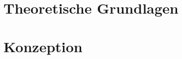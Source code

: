 


\newcommand{\thema}{HTWG Lab Cloud mit OpenStack}
\newcommand{\zusammenfassung}{Hier kommt eine kurze Zusammenfassung der Arbeit}

\newcommand{\ausgabedatum}{}
\newcommand{\abgabedatum}{}
\newcommand{\autor}{Dennis Parlak, Simon Kessler, Tobias Keh, Marco Grupe}
\newcommand{\autorStrasse}{}
\newcommand{\autorPLZ}{}
\newcommand{\autorOrt}{}
\newcommand{\autorGeburtsort}{}
\newcommand{\autorGeburtsdatum}{}
\newcommand{\prueferA}{Prof. Dr. Hanno Langweg}
\newcommand{\prueferB}{}
\newcommand{\firma}{}
\newcommand{\studiengang}{MSI Informatik}

\raggedbottom

\frontmatter


\setcounter{tocdepth}{1}
\tableofcontents 
\listoffigures
\listoftables
\printnomenclature

\mainmatter
    	
 	\part{Theoretische Grundlagen}

 		\part{Konzeption}
 		
		
   	\cleardoublepage
   	\setcounter{page}{12}
	 
	
\begin{appendix}   
\end{appendix}
\backmatter

